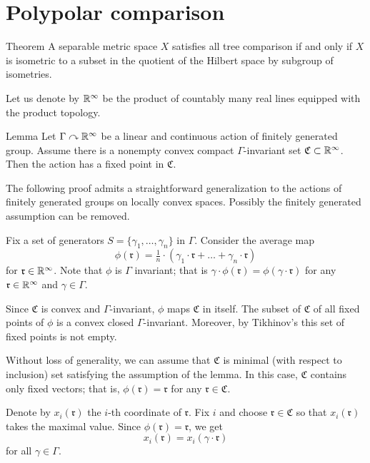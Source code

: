 \section{Polypolar comparison}\label{sec:all-tree}


\begin{thm}{Theorem}\label{thm:hilbert-quotient}
A separable metric space $X$ satisfies all tree comparison if and only if
$X$ is isometric to a subset in the quotient of the Hilbert space by subgroup of isometries.
\end{thm}

Let us denote by $\mathbb{R}^\infty$ be the product of countably many real lines equipped with the product topology.

\begin{thm}{Lemma}\label{lem:tikhonov}
Let $\Gamma\curvearrowright \mathbb{R}^\infty$ be a linear and continuous action of finitely generated group.
Assume there is a nonempty convex compact $\Gamma$-invariant set $\mathfrak{C}\subset \mathbb{R}^\infty$.
Then the action has a fixed point in $\mathfrak{C}$.
\end{thm}

The following proof admits a straightforward generalization to the actions of finitely generated groups on locally convex spaces.
Possibly the finitely generated assumption can be removed.

Fix a set of generators $S=\{\gamma_1,\dots,\gamma_n\}$ in $\Gamma$.
Consider the average map
\[\phi(\mathfrak{r})=\tfrac1{n}\cdot(\gamma_1\cdot \mathfrak{r}+\dots+\gamma_n\cdot \mathfrak{r})\]
for $\mathfrak{r}\in\mathbb{R}^\infty$.
Note that $\phi$ is $\Gamma$ invariant;
that is $\gamma\cdot \phi(\mathfrak{r})=\phi(\gamma\cdot\mathfrak{r})$ for any $\mathfrak{r}\in\mathbb{R}^\infty$ and $\gamma\in \Gamma$.

Since $\mathfrak{C}$ is convex and $\Gamma$-invariant, $\phi$ maps $\mathfrak{C}$ in itself.
The subset of $\mathfrak{C}$ of all fixed points of $\phi$ is a convex closed $\Gamma$-invariant.
Moreover, by Tikhinov's this set of fixed points is not empty.

Without loss of generality, we can assume that $\mathfrak{C}$ is minimal (with respect to inclusion) set satisfying the assumption of the lemma.
In this case, $\mathfrak{C}$ contains only fixed vectors;
that is, $\phi(\mathfrak{r})=\mathfrak{r}$ for any $\mathfrak{r}\in \mathfrak{C}$.

Denote by $x_i(\mathfrak{r})$ the $i$-th coordinate of $\mathfrak{r}$.
Fix $i$ and choose $\mathfrak{r}\in \mathfrak{C}$ so that $x_i(\mathfrak{r})$ takes the maximal value.
Since $\phi(\mathfrak{r})=\mathfrak{r}$, we get 
\[x_i(\mathfrak{r})=x_i(\gamma\cdot \mathfrak{r})\]
for all $\gamma\in\Gamma$.

